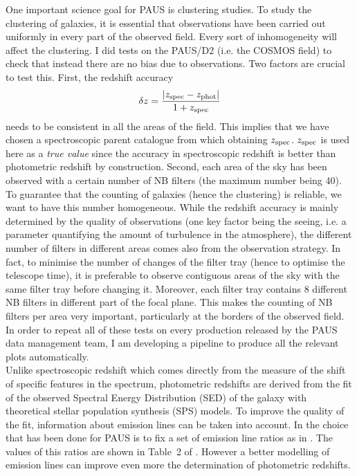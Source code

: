 \documentclass[11pt]{article}
\begin{document}
One important science goal for PAUS is clustering studies. To study the clustering of galaxies, it is essential that observations have been carried out uniformly in every part of the observed field. Every sort of inhomogeneity will affect the clustering. I did tests on the PAUS/D2 (i.e. the COSMOS field) to check that instead there are no bias due to observations. Two factors are crucial to test this. First, the redshift accuracy $$\delta z =  \frac{\lvert z_{\rm{spec}}-z_{\rm{phot}}\rvert}{1+z_{\rm{spec}}}$$ needs to be consistent in all the areas of the field. This implies that we have chosen a spectroscopic parent catalogue from which obtaining $z_{\rm{spec}}$. $z_{\rm{spec}}$ is used here as a \textit{true value} since the accuracy in spectroscopic redshift is better than photometric redshift by construction. Second, each area of the sky has been observed with a certain number of NB filters (the maximum number being 40). To guarantee that the counting of galaxies (hence the clustering) is reliable, we want to have this number homogeneous. While the redshift accuracy is mainly determined by the quality of observations (one key factor being the seeing, i.e. a parameter quantifying the amount of turbulence in the atmosphere), the different number of filters in different areas comes also from the observation strategy. In fact, to minimise the number of changes of the filter tray (hence to optimise the telescope time), it is preferable to observe contiguous areas of the sky with the same filter tray before changing it. Moreover, each filter tray contains 8 different NB filters in different part of the focal plane. This makes the counting of NB filters per area very important, particularly at the borders of the observed field. 
In order to repeat all of these tests on every production released by the PAUS data management team, I am developing a pipeline to produce all the relevant plots automatically. \\

Unlike spectroscopic redshift which comes directly from the measure of the shift of specific features in the spectrum, photometric redshifts are derived from the fit of the observed Spectral Energy Distribution (SED) of the galaxy with theoretical stellar population synthesis (SPS) models. To improve the quality of the fit, information about emission lines can be taken into account. In \cite{eriksen18} the choice that has been done for PAUS is to fix a set of emission line ratios as in \cite{ilbert09}. The values of this ratios are shown in Table~2 of \cite{eriksen18}.
However a better modelling of emission lines can improve even more the determination of photometric redshifts.
\end{document}
